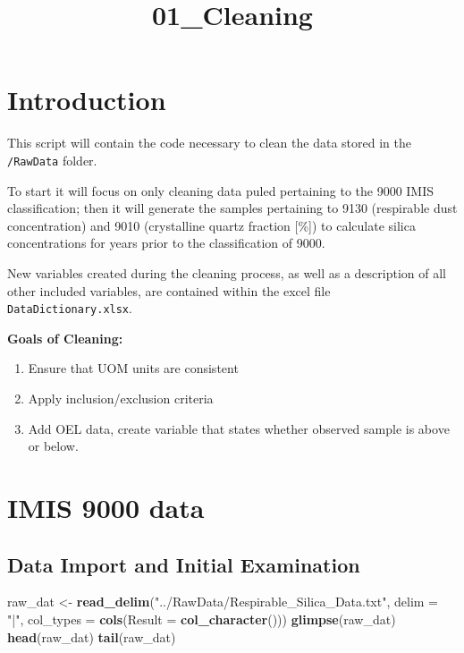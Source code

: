 \documentclass[
]{article}
\title{01\_Cleaning}
\author{}
\date{\vspace{-2.5em}}
\newenvironment{Shaded}{\begin{snugshade}}{\end{snugshade}}
\newcommand{\AttributeTok}[1]{\textcolor[rgb]{0.13,0.29,0.53}{#1}}
\newcommand{\FunctionTok}[1]{\textcolor[rgb]{0.13,0.29,0.53}{\textbf{#1}}}
\newcommand{\NormalTok}[1]{#1}
\newcommand{\OtherTok}[1]{\textcolor[rgb]{0.56,0.35,0.01}{#1}}
\newcommand{\StringTok}[1]{\textcolor[rgb]{0.31,0.60,0.02}{#1}}
\begin{document}
\maketitle

{
\setcounter{tocdepth}{3}
\tableofcontents
}
\section{Introduction}\label{introduction}

This script will contain the code necessary to clean the data stored in
the \texttt{/RawData} folder.

To start it will focus on only cleaning data puled pertaining to the
9000 IMIS classification; then it will generate the samples pertaining
to 9130 (respirable dust concentration) and 9010 (crystalline quartz
fraction {[}\%{]}) to calculate silica concentrations for years prior to
the classification of 9000.

New variables created during the cleaning process, as well as a
description of all other included variables, are contained within the
excel file \texttt{DataDictionary.xlsx}.

\textbf{Goals of Cleaning:}

\begin{enumerate}
\def\labelenumi{\arabic{enumi}.}
\item
  Ensure that UOM units are consistent
\item
  Apply inclusion/exclusion criteria
\item
  Add OEL data, create variable that states whether observed sample is
  above or below.
\end{enumerate}

\section{IMIS 9000 data}\label{imis-9000-data}

\subsection{Data Import and Initial
Examination}\label{data-import-and-initial-examination}

\begin{Shaded}
\begin{Highlighting}[]
\NormalTok{raw\_dat }\OtherTok{\textless{}{-}} \FunctionTok{read\_delim}\NormalTok{(}\StringTok{"../RawData/Respirable\_Silica\_Data.txt"}\NormalTok{, }\AttributeTok{delim =} \StringTok{"|"}\NormalTok{,}
           \AttributeTok{col\_types =} \FunctionTok{cols}\NormalTok{(}\AttributeTok{Result =} \FunctionTok{col\_character}\NormalTok{())) }
\FunctionTok{glimpse}\NormalTok{(raw\_dat)}
\FunctionTok{head}\NormalTok{(raw\_dat) }
\FunctionTok{tail}\NormalTok{(raw\_dat)}
\end{Highlighting}
\end{Shaded}
\end{document}
